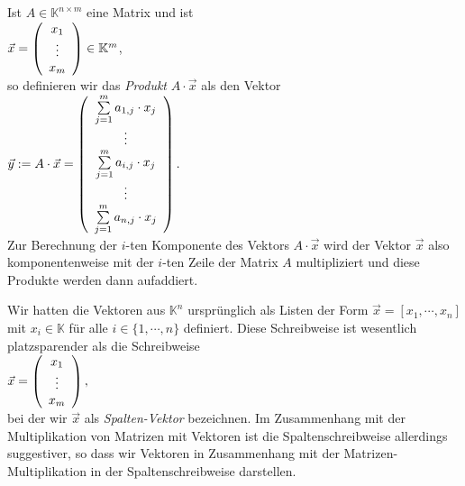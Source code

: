  Ist $A \in \mathbb{K}^{n \times m}$ eine Matrix und ist 
\\[0.5cm]
\hspace*{1.3cm}
$\vec{x} = \left(
      \begin{array}[c]{c}
      x_{1}  \\
      \vdots \\
      x_{m}  \\
      \end{array}
    \right) \in \mathbb{K}^m
$,
\\[0.5cm]
so definieren wir das \emph{Produkt} $A \cdot \vec{x}$ als den Vektor
\\[0.5cm]
\hspace*{1.3cm}
$\vec{y} := A \cdot \vec{x} = \left(
      \begin{array}[c]{c}
      \sum\limits_{j=1}^m a_{1,j} \cdot x_{j}  \\
      \vdots \\
      \sum\limits_{j=1}^m a_{i,j} \cdot x_{j}  \\
      \vdots \\
      \sum\limits_{j=1}^m a_{n,j} \cdot x_{j}  \\
      \end{array}
      \right). 
$
\\[0.5cm]
Zur Berechnung der $i$-ten Komponente des Vektors $A \cdot \vec{x}$ wird der Vektor $\vec{x}$
also komponentenweise mit der $i$-ten Zeile der Matrix $A$ multipliziert und diese Produkte werden
dann aufaddiert.

\remark
Wir hatten die Vektoren aus $\mathbb{K}^n$ urspr\"{u}nglich als Listen der Form $\vec{x} = [x_1, \cdots, x_n]$ mit
$x_i \in \mathbb{K}$ f\"{u}r alle $i\in\{1,\cdots,n\}$ definiert.  Diese Schreibweise ist wesentlich
platzsparender als die Schreibweise
\\[0.2cm]
\hspace*{1.3cm}
$\vec{x} = \left(
      \begin{array}[c]{c}
      x_{1}  \\
      \vdots \\
      x_{m}  \\
      \end{array}
      \right),
$
\\[0.2cm]
bei der wir $\vec{x}$ als \emph{Spalten-Vektor} bezeichnen.  Im Zusammenhang mit der
Multiplikation von Matrizen mit Vektoren ist die Spaltenschreibweise allerdings 
suggestiver, so dass wir Vektoren in Zusammenhang mit der Matrizen-Multiplikation in der
Spaltenschreibweise darstellen.
\eoxs 

